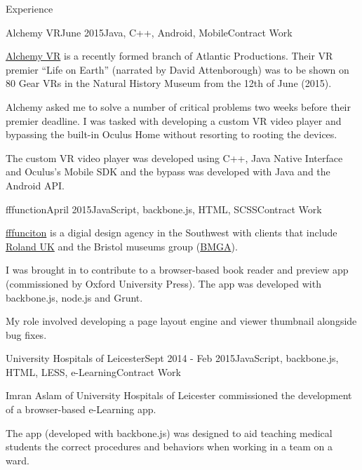 \documentclass{resume} %
\begin{document}
\begin{rSection}{Experience}

\begin{rSubsection}{Alchemy VR}{June 2015}{Java, C++, Android, Mobile}{Contract Work}
\item \href{http://www.alchemyvr.com/}{Alchemy VR} is a recently formed branch of Atlantic Productions. Their VR premier ``Life on Earth'' (narrated by David Attenborough) was to be shown on 80 Gear VRs in the Natural History Museum from the 12th of June (2015).
\item Alchemy asked me to solve a number of critical problems two weeks before their premier deadline. I was tasked with developing a custom VR video player and bypassing the built-in Oculus Home without resorting to rooting the devices.
\item The custom VR video player was developed using C++, Java Native Interface and Oculus's Mobile SDK and the bypass was developed with Java and the Android API.
\end{rSubsection}


\begin{rSubsection}{fffunction}{April 2015}{JavaScript, backbone.js, HTML, SCSS}{Contract Work}
\item \href{http://fffunction.co/}{fffunciton} is a digial design agency in the Southwest with clients that include \href{http://www.roland.co.uk}{Roland UK} and the Bristol museums group (\href{http://bristolmuseums.org.uk}{BMGA}).
\item I was brought in to contribute to a browser-based book reader and preview app (commissioned by Oxford University Press). The app was developed with backbone.js, node.js and Grunt. 
\item My role involved developing a page layout engine and viewer thumbnail alongside bug fixes.
\end{rSubsection}


\begin{rSubsection}{University Hospitals of Leicester}{Sept 2014 - Feb 2015}{JavaScript, backbone.js, HTML, LESS, e-Learning}{Contract Work}
\item Imran Aslam of University Hospitals of Leicester commissioned the development of a browser-based e-Learning app.
\item The app (developed with backbone.js) was designed to aid teaching medical students the correct procedures and behaviors when working in a team on a ward.
\end{rSubsection}


\end{rSection}
\end{document}
